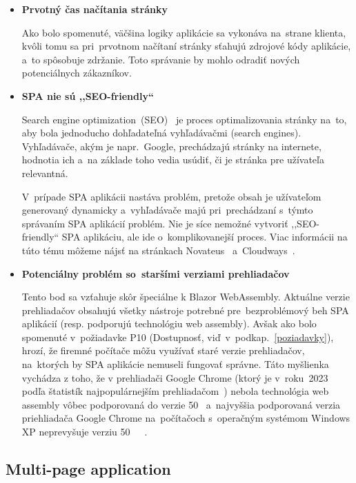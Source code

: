 \begin{itemize}
\item \textbf{Prvotný čas načítania stránky}

Ako bolo spomenuté, väčšina logiky aplikácie sa vykonáva na~strane klienta, kvôli tomu sa pri~prvotnom načítaní stránky sťahujú zdrojové kódy aplikácie, a~to spôsobuje zdržanie. Toto správanie by mohlo odradiť nových potenciálnych zákazníkov.
\newpage
\item \textbf{SPA nie sú ,,SEO-friendly``}

Search engine optimization~(SEO)~\cite{seo} je proces optimalizovania stránky na~to, aby bola jednoducho dohľadateľná vyhľadávačmi (search engines). Vyhľadávače, akým je napr.~Google, prechádzajú stránky na internete, hodnotia ich a~na základe toho vedia usúdiť, či je stránka pre užívateľa relevantná.

V~prípade SPA aplikácii nastáva problém, pretože obsah je užívateľom generovaný dynamicky a~vyhľadávače majú pri~prechádzaní s~týmto správaním SPA aplikácií problém. Nie je síce nemožné vytvoriť ,,SEO-friendly`` SPA aplikáciu, ale ide o~komplikovanejší proces. Viac informácii na túto tému môžeme nájsť na stránkach Novateus~\cite{novateus} a~Cloudways~\cite{cloudways}.

\item \textbf{Potenciálny problém so~staršími verziami prehliadačov}

Tento bod sa vzťahuje skôr špeciálne k Blazor WebAssembly. Aktuálne verzie prehliadačov obsahujú všetky nástroje potrebné pre~bezproblémový beh SPA aplikácií (resp. podporujú technológiu web assembly). Avšak ako bolo spomenuté v~požiadavke P10 (Dostupnosť, viď~v~podkap.~\ref{poziadavky}), hrozí, že firemné počítače môžu využívať staré verzie prehliadačov, na~ktorých by SPA aplikácie nemuseli fungovať správne. Táto myšlienka vychádza z toho, že v prehliadači Google Chrome (ktorý je v~roku~2023 podľa štatistík najpopulárnejším prehliadačom~\cite{stats}) nebola technológia web assembly vôbec podporovaná do verzie 50~\cite{wa support} a~najvyššia podporovaná verzia priehliadača Google Chrome na~počítačoch s~operačným systémom Windows XP neprevyšuje verziu 50~\cite{chromexpver1}~\cite{chromexpver2}~\cite{chromexpver3}.
\end{itemize}

\subsection{Multi-page application}
\label{multi page application}

